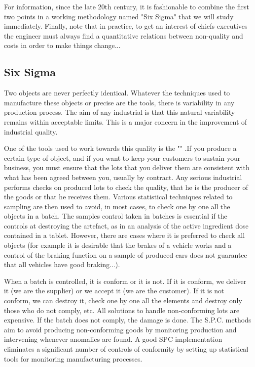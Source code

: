 For information, since the late 20th century, it is fashionable to combine the first two points in a working methodology named "Six Sigma" that we will study immediately. Finally, note that in practice, to get an interest of chiefs executives the engineer must always find a quantitative relations between non-quality and costs in order to make things change...

\subsection{Six Sigma}

Two objects are never perfectly identical. Whatever the techniques used to manufacture these objects or precise are the tools, there is variability in any production process. The aim of any industrial is that this natural variability remains within acceptable limits. This is a major concern in the improvement of industrial quality.

One of the tools used to work towards this quality is the "" .If you produce a certain type of object, and if you want to keep your customers to sustain your business, you must ensure that the lots that you deliver them are consistent with what has been agreed between you, usually by contract. Any serious  industrial performs checks on produced lots to check the quality, that he is the producer of the goods or that he receives them. Various statistical techniques related to sampling are then used to avoid, in most cases, to check one by one all the objects in a batch. The samples control  taken in batches is essential if the controls at destroying the artefact, as in an analysis of the active ingredient dose contained in a tablet. However, there are cases where it is preferred to check all objects (for example it is desirable that the brakes of a vehicle works and a control of the braking function on a sample of produced cars does not guarantee that all vehicles have good braking...).

When a batch is controlled, it is conform or it is not. If it is conform, we deliver it (we are the supplier) or we accept it (we are the customer). If it is not conform, we can destroy it, check one by one all the elements and destroy only those who do not comply, etc. All solutions to handle non-conforming lots are expensive. If the batch does not comply, the damage is done. The S.P.C. methods aim to avoid producing non-conforming goods by monitoring production and intervening whenever anomalies are found. A good SPC implementation eliminates a significant number of controls of conformity by setting up statistical tools for monitoring manufacturing processes.

